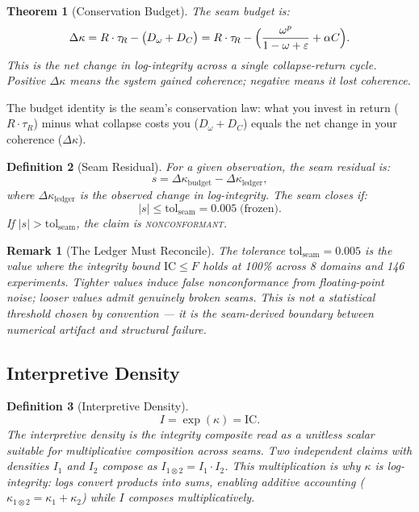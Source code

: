 \documentclass[
  aps,
  prd,
  preprint,
  superscriptaddress,
  nofootinbib,
  floatfix,
  longbibliography
]{revtex4-2}
\newtheorem{theorem}{Theorem}
\newtheorem{definition}[theorem]{Definition}
\newtheorem{remark}{Remark}
\newcommand{\tR}{\tau_{\!R}}
\newcommand{\eps}{\varepsilon}
\newcommand{\tolseam}{\mathrm{tol}_{\mathrm{seam}}}
\newcommand{\beq}{\begin{equation}}
\newcommand{\eeq}{\end{equation}}
\newcommand{\regime}[1]{\textrm{\upshape\scshape#1}}
\newcommand{\nonconform}{\regime{nonconformant}}
\newcommand{\IC}{\mathrm{IC}}
\newcommand{\Fid}{F}
\newcommand{\Drft}{\omega}
\newcommand{\Curv}{C}
\newcommand{\Logint}{\kappa}
\begin{document}
\begin{theorem}[Conservation Budget]\label{thm:budget}
The seam budget is:
\beq\label{eq:budget}
  \Delta\Logint = R \cdot \tR
    - \bigl(D_\Drft + D_\Curv\bigr)
  = R \cdot \tR
    - \Bigl(\frac{\Drft^p}{1 - \Drft + \eps} + \alpha \Curv\Bigr).
\eeq
This is the net change in log-integrity across a single
collapse-return cycle.
Positive $\Delta\Logint$ means the system gained coherence;
negative means it lost coherence.
\end{theorem}

The budget identity is the seam's conservation law:
what you invest in return ($R \cdot \tR$) minus
what collapse costs you ($D_\Drft + D_\Curv$) equals
the net change in your coherence ($\Delta\Logint$).

\begin{definition}[Seam Residual]\label{def:residual}
For a given observation, the seam residual is:
\beq
  s = \Delta\Logint_{\mathrm{budget}}
    - \Delta\Logint_{\mathrm{ledger}},
\eeq
where $\Delta\Logint_{\mathrm{ledger}}$ is the observed
change in log-integrity.
The seam closes if:
\beq
  |s| \leq \tolseam = 0.005 \;\text{(frozen)}.
\eeq
If $|s| > \tolseam$, the claim is \nonconform{}.
\end{definition}

\begin{remark}[The Ledger Must Reconcile]
The tolerance $\tolseam = 0.005$ is the value where the
integrity bound $\IC \leq \Fid$ holds at 100\%
across 8 domains and 146 experiments.
Tighter values induce false nonconformance from
floating-point noise; looser values admit genuinely
broken seams.
This is not a statistical threshold chosen by convention
— it is the seam-derived boundary between numerical
artifact and structural failure.
\end{remark}

\subsection{Interpretive Density}

\begin{definition}[Interpretive Density]\label{def:I}
\beq
  I = \exp(\Logint) = \IC.
\eeq
The interpretive density is the integrity composite read
as a unitless scalar suitable for multiplicative
composition across seams.
Two independent claims with densities $I_1$ and $I_2$
compose as $I_{1 \otimes 2} = I_1 \cdot I_2$.
This multiplication is why $\Logint$ is
\emph{log}-integrity: logs convert products into sums,
enabling additive accounting ($\Logint_{1 \otimes 2}
= \Logint_1 + \Logint_2$) while $I$ composes
multiplicatively.
\end{definition}
\end{document}
